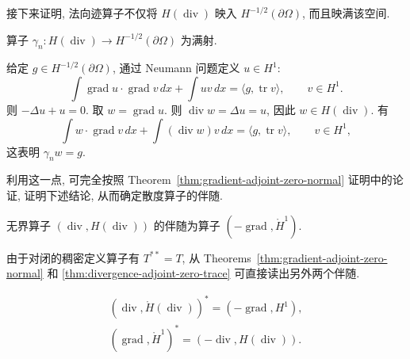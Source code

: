 {接下来证明, 法向迹算子不仅将 $H(\operatorname{div})$ 映入 $H^{-1/2}(\partial\Omega)$, 而且映满该空间.}


\begin{Theorem}\label{thm:normal-trace-surjective}
{算子 $\gamma_n:H(\operatorname{div})\to H^{-1/2}(\partial\Omega)$ 为满射.}
\end{Theorem}

\begin{Proof}
{给定 $g\in H^{-1/2}(\partial\Omega)$, 通过 Neumann 问题定义 $u\in H^1$:}
\[
\int\operatorname{grad}u\cdot\operatorname{grad}v\,dx+\int uv\,dx=\langle g,\operatorname{tr}v\rangle,\qquad v\in H^1.
\]
{则 $-\Delta u+u=0$. 取 $w=\operatorname{grad}u$. 则 $\operatorname{div}w=\Delta u=u$, 因此 $w\in H(\operatorname{div})$. 有}
\[
\int w\cdot\operatorname{grad}v\,dx+\int(\operatorname{div}w)v\,dx=\langle g,\operatorname{tr}v\rangle,\qquad v\in H^1,
\]
{这表明 $\gamma_n w=g$.}
\end{Proof}

{利用这一点, 可完全按照 Theorem~\ref{thm:gradient-adjoint-zero-normal} 证明中的论证, 证明下述结论, 从而确定散度算子的伴随.}


\begin{Theorem}\label{thm:divergence-adjoint-zero-trace}
{无界算子 $(\operatorname{div},H(\operatorname{div}))$ 的伴随为算子 $(-\operatorname{grad},\mathring H^1)$.}
\end{Theorem}

{由于对闭的稠密定义算子有 $T^{**}=T$, 从 Theorems~\ref{thm:gradient-adjoint-zero-normal} 和 \ref{thm:divergence-adjoint-zero-trace} 可直接读出另外两个伴随.}


\begin{Theorem}\label{thm:reverse-gradient-divergence-adjoints}
\[
\begin{gathered}
(\operatorname{div},\mathring H(\operatorname{div}))^*=(-\operatorname{grad},H^1),\\
(\operatorname{grad},\mathring H^1)^*=(-\operatorname{div},H(\operatorname{div})).
\end{gathered}
\]
\end{Theorem}

